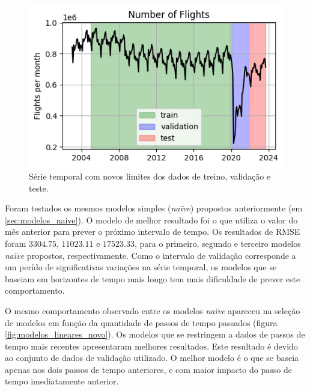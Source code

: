 \documentclass[final,5p]{elsarticle}
\numberwithin{equation}{section}
\begin{document}
        \begin{figure}[hbt!]
            \includegraphics[width=0.95\columnwidth]{C1_TrainTest.png}
            \caption{Série temporal com novos limites dos dados de treino, validação e teste.}
            \label{fig:treino_teste_modelo_dois}
        \end{figure}

        Foram testados os mesmos modelos simples (\emph{naïve}) propostos anteriormente (em \ref{sec:modelos_naive}). O modelo de melhor resultado foi o que utiliza o valor do mês anterior para prever o próximo intervalo de tempo. Os resultados de RMSE foram $3304.75$, $11023.11$ e $17523.33$, para o primeiro, segundo e terceiro modelos \emph{naïve} propostos, respectivamente. Como o intervalo de validação corresponde a um perído de significativas variações na série temporal, os modelos que se baseiam em horizontes de tempo mais longo tem mais dificuldade de prever este comportamento.

        O mesmo comportamento observado entre os modelos \emph{naïve} apareceu na seleção de modelos em função da quantidade de passos de tempo passados (figura \ref{fig:modelos_lineares_novo}). Os modelos que se restringem a dados de passos de tempo mais recentes apresentaram melhores resultados. Este resultado é devido ao conjunto de dados de validação utilizado. O melhor modelo é o que se baseia apenas nos dois passos de tempo anteriores, e com maior impacto do passo de tempo imediatamente anterior.
\end{document}
